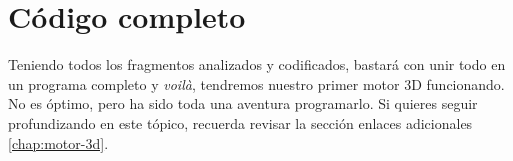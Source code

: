 \section{Código completo}

Teniendo todos los fragmentos analizados y codificados, bastará con unir todo en un programa completo y \emph{voilà}, tendremos nuestro primer motor 3D funcionando. No es óptimo, pero ha sido toda una aventura programarlo. Si quieres seguir profundizando en este tópico, recuerda revisar la sección enlaces adicionales \autoref{chap:motor-3d}.



